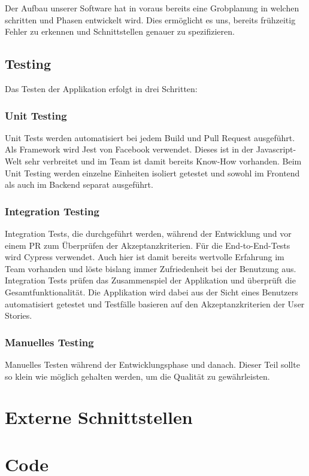 \documentclass[a4paper, 11pt]{scrartcl}
\let\oldsection\section
\renewcommand\section{\clearpage\oldsection}
\begin{document}
Der Aufbau unserer Software hat in voraus bereits eine Grobplanung in welchen schritten und Phasen entwickelt wird.
Dies ermöglicht es uns, bereits frühzeitig Fehler zu erkennen und Schnittstellen genauer zu spezifizieren.

\subsection{Testing}
Das Testen der Applikation erfolgt in drei Schritten:

\subsubsection{Unit Testing}
Unit Tests werden automatisiert bei jedem Build und Pull Request ausgeführt.
Als Framework wird Jest von Facebook verwendet. Dieses ist in der Javascript-Welt sehr verbreitet und im Team ist damit bereits Know-How vorhanden.
Beim Unit Testing werden einzelne Einheiten isoliert getestet und sowohl im Frontend als auch im Backend separat ausgeführt.

\subsubsection{Integration Testing}
Integration Tests, die durchgeführt werden, während der Entwicklung und vor einem PR zum Überprüfen der Akzeptanzkriterien.
Für die End-to-End-Tests wird Cypress verwendet. Auch hier ist damit bereits wertvolle Erfahrung im Team vorhanden
und löste bislang immer Zufriedenheit bei der Benutzung aus.
Integration Tests prüfen das Zusammenspiel der Applikation und überprüft die Gesamtfunktionalität.
Die Applikation wird dabei aus der Sicht eines Benutzers automatisiert getestet und Testfälle basieren
auf den Akzeptanzkriterien der User Stories.

\subsubsection{Manuelles Testing}
Manuelles Testen während der Entwicklungsphase und danach. Dieser Teil sollte so klein wie möglich gehalten werden, um die Qualität zu gewährleisten.

\section{Externe Schnittstellen}

\section{Code}
\end{document}

